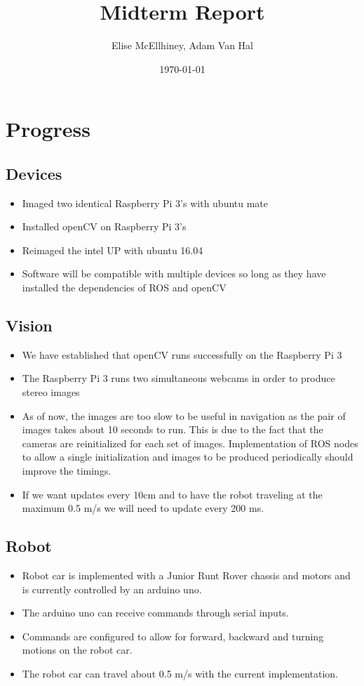 \documentclass[11pt]{amsart}
\title{Midterm Report}
\author{Elise McEllhiney, Adam Van Hal}
\date{\today}                                           %
\begin{document}
\maketitle

\section{Progress}
\subsection{Devices}
\begin{itemize}
\item Imaged two identical Raspberry Pi 3's with ubuntu mate
\item Installed openCV on Raspberry Pi 3's
\item Reimaged the intel UP with ubuntu 16.04
\item Software will be compatible with multiple devices so long as they have installed the dependencies of ROS and openCV
\end{itemize}

\subsection{Vision}
\begin{itemize}
\item We have established that openCV runs successfully on the Raspberry Pi 3
\item The Raspberry Pi 3 runs two simultaneous webcams in order to produce stereo images
\item As of now, the images are too slow to be useful in navigation as the pair of images takes about 10 seconds to run.  This is due to the fact that the cameras are reinitialized for each set of images.  Implementation of ROS nodes to allow a single initialization and images to be produced periodically should improve the timings.
\item If we want updates every 10cm and to have the robot traveling at the maximum 0.5 m/s we will need to update every 200 ms.
\end{itemize}

\subsection{Robot}
\begin{itemize}
\item Robot car is implemented with a Junior Runt Rover chassis and motors and is currently controlled by an arduino uno.
\item The arduino uno can receive commands through serial inputs.
\item Commands are configured to allow for forward, backward and turning motions on the robot car.
\item The robot car can travel about 0.5 m/s with the current implementation.
\end{itemize}
\end{document}
